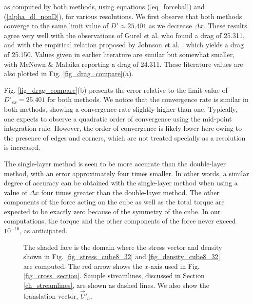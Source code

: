 as computed by both methods, using equations (\ref{eq_forcebal}) and (\ref{alpha_dl_nonD}), for various resolutions. We first observe that both methods converge to the same limit value of $D'  \approx 25.401$ as we decrease $\Delta x$.
These results agree very well with the observations of
Gurel {\textit et al.} 
\cite{gurel_studies_1955} who found a drag of 25.311, and with the empirical relation proposed by 
Johnson {\textit et al.} 
\cite{johnson_drag_1987}, which yields a drag of 25.150. Values given in earlier literature are similar but somewhat smaller, with 
 McNown \& Malaika  \cite{mcnown_effects_1950} 
reporting a drag of 24.311. These literature values are also plotted in  Fig. \ref{fig_drag_compare}(a).
\par
Fig. \ref{fig_drag_compare}(b) presents the error relative to the limit value of $D'_{ex}  = 25.401$ for both methods.
We notice that the convergence rate is similar in both methods, showing a convergence rate slightly higher than one. 
 Typically, one expects to observe a quadratic order of convergence using the mid-point integration rule. However, the order of convergence is likely lower here owing to the presence of edges and corners, which are not treated specially as a resolution is increased.
 \par
The single-layer method is seen to be more accurate than the double-layer method, with an error approximately four times smaller. In other words, a similar degree of accuracy can be obtained with the single-layer method when using a value of $\Delta x$ four times greater than the double-layer method.
The other components of the force acting on the cube as well as the total torque are expected to be exactly zero because of the symmetry of the cube.
In our computations, the torque and the other components of the force never exceed $10^{-10}$, as anticipated. 

\begin{figure}[ht]
	\begin{center}
	\end{center}
	\caption{The shaded face is the domain where the stress vector and density shown in Fig. \ref{fig_stress_cube8_32} and	\ref{fig_density_cube8_32} are computed. The red arrow shows the $x$-axis used in Fig.  \ref{fig_cross_section}. Sample streamlines, discussed in Section \ref{ch_streamlines}, are shown as dashed lines. We also show the translation vector,  $\vec{U}'_a$.}
	\label{fig_face_description}
\end{figure}


